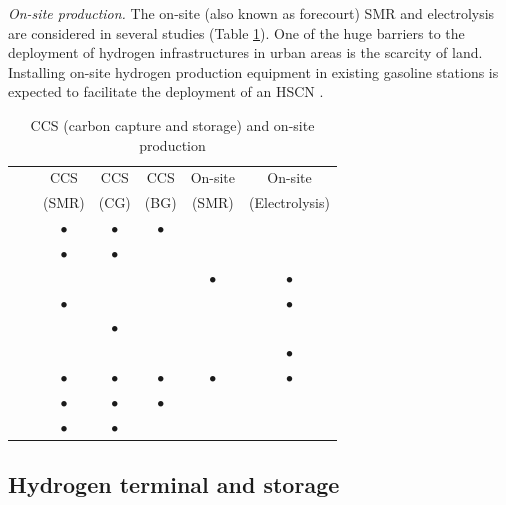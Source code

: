 \documentclass[11pt,3p]{elsarticle}
\begin{document}
\textit{On-site production.} The on-site (also known as forecourt) SMR and electrolysis are considered in several studies (Table \ref{tab:CCSOnsite}). One of the huge barriers to the deployment of hydrogen infrastructures in urban areas is the scarcity of land. Installing on-site hydrogen production equipment in existing gasoline stations is expected to facilitate the deployment of an HSCN \citep{katikaneni2014site}.

\begin{table}[!htbp]
\centering
\caption{CCS (carbon capture and storage) and on-site production}
\label{tab:CCSOnsite}
\begin{tabular}{llccccc}
\hline
 &  & CCS & CCS & CCS & On-site & On-site \\
 &  & (SMR) & (CG) & (BG) & (SMR) & (Electrolysis) \\ \hline
\citet{agnolucci2013importance} &  & $\bullet$ & $\bullet$ & $\bullet$ &  &  \\
\citet{almansoori2016design} &  & $\bullet$ & $\bullet$ &  &  &  \\
\citet{almansoori2012design} &  &  &  &  & $\bullet$ & $\bullet$ \\
\citet{han2013multi} &  & $\bullet$ &  &  &  & $\bullet$ \\
\citet{johnson2012spatially} &  &  & $\bullet$ &  &  &  \\
\citet{kim2017integrated} &  &  &  &  &  & $\bullet$ \\
\citet{konda2011optimal} &  & $\bullet$ & $\bullet$ & $\bullet$ & $\bullet$ & $\bullet$ \\
\citet{moreno2017towards} &  & $\bullet$ & $\bullet$ & $\bullet$ &  &  \\
\citet{sabio2010strategic} &  & $\bullet$ & $\bullet$ &  &  &  \\ \hline
\end{tabular}
\end{table}

\subsection{Hydrogen terminal and storage}
\end{document}
